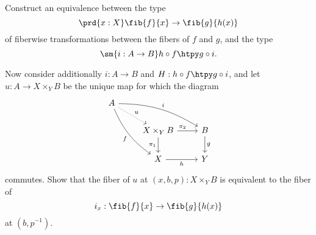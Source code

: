 \begin{exercises}
\begin{subexenum}
\item Construct an equivalence between the type
\begin{equation*}
\prd{x:X}\fib{f}{x}\to\fib{g}{h(x)}
\end{equation*}
of fiberwise transformations between the fibers of $f$ and $g$, and the type
\begin{equation*}
\sm{i:A\to B} h\circ f\htpy g\circ i.
\end{equation*}
\item Now consider additionally $i:A\to B$ and $H:h\circ f\htpy g\circ i$, and let $u:A\to X\times_Y B$ be the unique map for which the diagram
\begin{equation*}
\begin{tikzcd}
A \arrow[ddr,bend right=15,swap,"f"] \arrow[dr,densely dotted,"u"] \arrow[drr,bend left=15,"i"] \\
& X\times_Y B \arrow[d,swap,"\pi_1"] \arrow[r,"\pi_2" near start] & B \arrow[d,"g"] \\
& X \arrow[r,swap,"h"] & Y
\end{tikzcd}
\end{equation*}
commutes. Show that the fiber of $u$ at $(x,b,p):X\times_Y B$ is equivalent to the fiber of
\begin{equation*}
i_x:\fib{f}{x} \to \fib{g}{h(x)}
\end{equation*}
at $(b,p^{-1})$. 
\end{subexenum}
\end{exercises}
